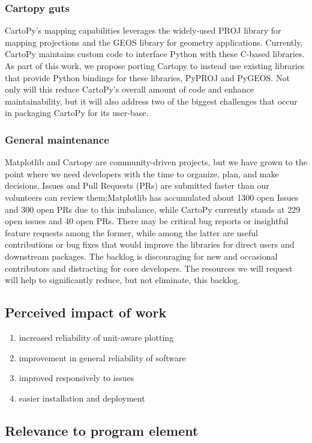 \documentclass[12pt]{article}
\numberwithin{page}{section}
\begin{document}
\subsubsection{Cartopy guts}
CartoPy's mapping capabilities leverages the widely-used PROJ library
for mapping projections and the GEOS library for geometry
applications. Currently, CartoPy maintains custom code to interface
Python with these C-based libraries. As part of this work, we propose
porting Cartopy to instead use existing libraries that provide Python
bindings for these libraries, PyPROJ and PyGEOS. Not only will this
reduce CartoPy's overall amount of code and enhance maintainability,
but it will also address two of the biggest challenges that occur in
packaging CartoPy for its user-base.

\subsubsection{General maintenance}

Matplotlib and Cartopy are community-driven projects, but we have
grown to the point where we need developers with the time to organize,
plan, and make decisions. Issues and Pull Requests (PRs) are submitted
faster than our volunteers can review them;Matplotlib has accumulated
about 1300 open Issues and 300 open PRs due to this imbalance, while
CartoPy currently stands at 229 open issues and 40 open PRs. There may
be critical bug reports or insightful feature requests among the
former, while among the latter are useful contributions or bug fixes
that would improve the libraries for direct users and downstream
packages. The backlog is discouraging for new and occasional
contributors and distracting for core developers. The resources we
will request will help to significantly reduce, but not eliminate,
this backlog.

\subsection{Perceived impact of work}
\begin{enumerate}
\item increased reliability of unit-aware plotting
\item improvement in general reliability of software
\item improved responsively to issues
\item easier installation and deployment
\end{enumerate}
\subsection{Relevance to program element}
\end{document}
